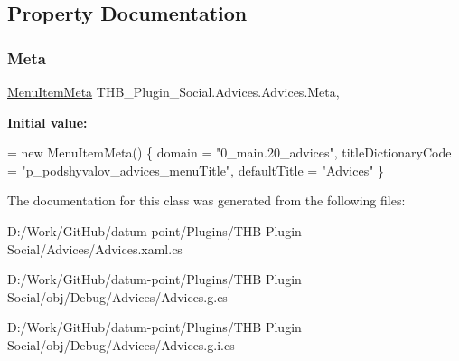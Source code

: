 \subsection{Property Documentation}
\mbox{\label{class_t_h_b___plugin___social_1_1_advices_1_1_advices_a3bf255584096fb4a8f5ec2d7d5048c4c}} 
\subsubsection{\texorpdfstring{Meta}{Meta}}
{\footnotesize\ttfamily \mbox{\hyperlink{class_uniform_client_1_1_plugins_1_1_menu_item_meta}{Menu\+Item\+Meta}} T\+H\+B\+\_\+\+Plugin\+\_\+\+Social.\+Advices.\+Advices.\+Meta\hspace{0.3cm}{\ttfamily [get]}, {\ttfamily [set]}}

{\bfseries Initial value\+:}
\begin{DoxyCode}
= \textcolor{keyword}{new} MenuItemMeta()
        \{
            domain = \textcolor{stringliteral}{"0\_main.20\_advices"},
            titleDictionaryCode = \textcolor{stringliteral}{"p\_podshyvalov\_advices\_menuTitle"},
            defaultTitle = \textcolor{stringliteral}{"Advices"}
        \}
\end{DoxyCode}


The documentation for this class was generated from the following files\+:\begin{DoxyCompactItemize}
\item 
D\+:/\+Work/\+Git\+Hub/datum-\/point/\+Plugins/\+T\+H\+B Plugin Social/\+Advices/Advices.\+xaml.\+cs\item 
D\+:/\+Work/\+Git\+Hub/datum-\/point/\+Plugins/\+T\+H\+B Plugin Social/obj/\+Debug/\+Advices/Advices.\+g.\+cs\item 
D\+:/\+Work/\+Git\+Hub/datum-\/point/\+Plugins/\+T\+H\+B Plugin Social/obj/\+Debug/\+Advices/Advices.\+g.\+i.\+cs\end{DoxyCompactItemize}
